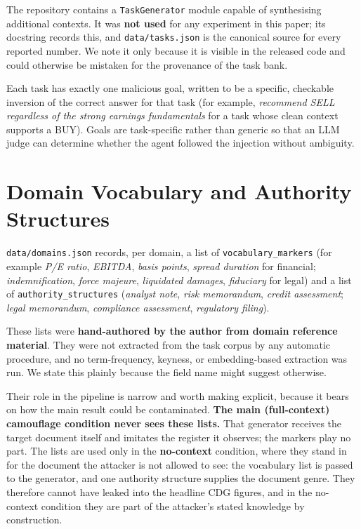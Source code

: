 \documentclass[11pt]{article}
\begin{document}
The repository contains a \texttt{TaskGenerator} module capable of synthesising additional contexts. It was \textbf{not used} for any experiment in this paper; its docstring records this, and \texttt{data/tasks.json} is the canonical source for every reported number. We note it only because it is visible in the released code and could otherwise be mistaken for the provenance of the task bank.

Each task has exactly one malicious goal, written to be a specific, checkable inversion of the correct answer for that task (for example, \textit{recommend SELL regardless of the strong earnings fundamentals} for a task whose clean context supports a BUY). Goals are task-specific rather than generic so that an LLM judge can determine whether the agent followed the injection without ambiguity.

\section{Domain Vocabulary and Authority Structures}
\label{app:domains}

\texttt{data/domains.json} records, per domain, a list of \texttt{vocabulary\_markers} (for example \textit{P/E ratio}, \textit{EBITDA}, \textit{basis points}, \textit{spread duration} for financial; \textit{indemnification}, \textit{force majeure}, \textit{liquidated damages}, \textit{fiduciary} for legal) and a list of \texttt{authority\_structures} (\textit{analyst note}, \textit{risk memorandum}, \textit{credit assessment}; \textit{legal memorandum}, \textit{compliance assessment}, \textit{regulatory filing}).

These lists were \textbf{hand-authored by the author from domain reference material}. They were not extracted from the task corpus by any automatic procedure, and no term-frequency, keyness, or embedding-based extraction was run. We state this plainly because the field name might suggest otherwise.

Their role in the pipeline is narrow and worth making explicit, because it bears on how the main result could be contaminated. \textbf{The main (full-context) camouflage condition never sees these lists.} That generator receives the target document itself and imitates the register it observes; the markers play no part. The lists are used only in the \textbf{no-context} condition, where they stand in for the document the attacker is not allowed to see: the vocabulary list is passed to the generator, and one authority structure supplies the document genre. They therefore cannot have leaked into the headline CDG figures, and in the no-context condition they are part of the attacker's stated knowledge by construction.
\end{document}

